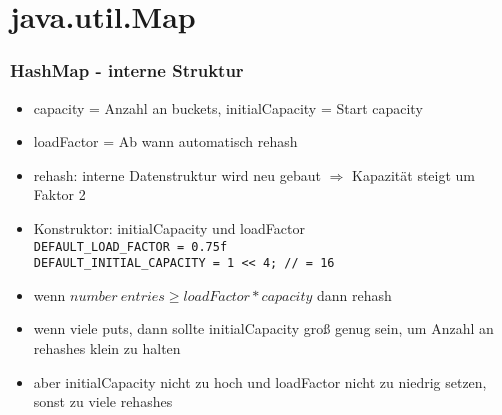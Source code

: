 \section{java.util.Map}




\begin{frame}[fragile]
\frametitle{HashMap - interne Struktur}
\begin{itemize}[<+->]
  \item capacity = Anzahl an buckets, initialCapacity = Start capacity
  \item loadFactor = Ab wann automatisch rehash
  \item rehash: interne Datenstruktur wird neu gebaut $\Rightarrow$ Kapazität steigt um Faktor 2
  \item Konstruktor: initialCapacity und loadFactor \\
	\verb+DEFAULT_LOAD_FACTOR = 0.75f+ \\
	\verb+DEFAULT_INITIAL_CAPACITY = 1 << 4; // = 16+
  \item wenn $number\ entries \geq loadFactor * capacity$ dann rehash
  \item wenn viele puts, dann sollte initialCapacity groß genug sein, um Anzahl an rehashes klein zu halten
  \item aber initialCapacity nicht zu hoch und loadFactor nicht zu niedrig setzen, sonst zu viele rehashes
\end{itemize}
\end{frame}

